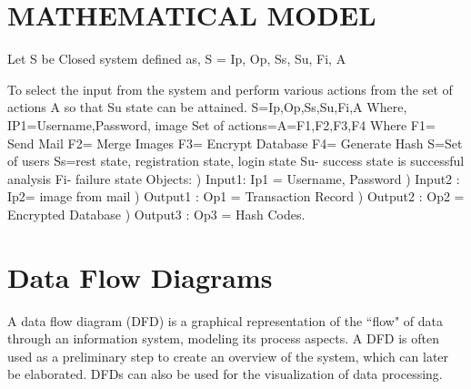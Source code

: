 \documentclass[oneside,a4paper,12pt]{report}
\begin{document}
\newpage

\section{MATHEMATICAL MODEL}

Let
\newline
S be Closed system defined as, S = { Ip, Op, Ss, Su, Fi, A}

To select the input from the system and perform various actions from the set of actions A so that Su state can be attained.
\newline 
S={Ip,Op,Ss,Su,Fi,A}
\newline
Where,
\newline   
IP1={Username,Password, image}
\newline
Set of actions=A={F1,F2,F3,F4}
\newline
Where
\newline
F1= Send Mail
\newline
F2= Merge Images
\newline
F3= Encrypt Database
\newline
F4= Generate Hash
\newline
S=Set of users
\newline
Ss={rest state, registration state, login state}
\newline
Su- success state is successful analysis
\newline
Fi- failure state 
\newline
Objects:
)	Input1: Ip1 = {Username, Password}
)	Input2 : Ip2= {image from mail}
)	Output1 : Op1 = Transaction Record 
)	Output2 : Op2 = Encrypted Database
)	Output3 : Op3 = Hash Codes.
\newpage
\section{Data Flow Diagrams}
\hspace*{0.5cm} A data flow diagram (DFD) is a graphical representation of the ``flow" of data through an information system, modeling its process aspects. A DFD is often used as a preliminary step to create an overview of the system, which can later be elaborated. DFDs can also be used for the visualization of data processing.  
\end{document}
